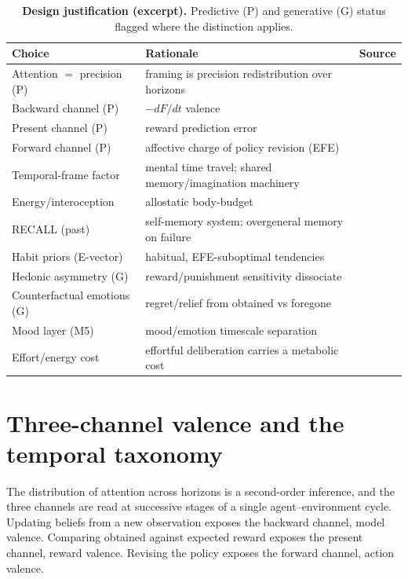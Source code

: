 \documentclass[11pt,a4paper]{article}
\begin{document}
\begin{table}[htbp]
\centering\small
\caption{\textbf{Design justification (excerpt).} Predictive (P) and generative (G)
status flagged where the distinction applies.}
\label{tab:justification}
\begin{tabular}{p{3.3cm}p{6.0cm}p{3.7cm}}
\toprule
Choice & Rationale & Source \\
\midrule
Attention $=$ precision (P) & framing is precision redistribution over horizons & \citet{feldman2010attention} \\
Backward channel (P) & $-dF/dt$ valence & \citet{joffily2013emotional} \\
Present channel (P) & reward prediction error & \citet{pattisapu2024free} \\
Forward channel (P) & affective charge of policy revision (EFE) & \citet{hesp2021deeply} \\
Temporal-frame factor & mental time travel; shared memory/imagination machinery & \citet{schacter-addis2007,suddendorf-corballis1997} \\
Energy/interoception & allostatic body-budget & \citet{seth2016interoceptive,stephan2016allostatic} \\
RECALL (past) & self-memory system; overgeneral memory on failure & \citet{williams2007autobiographical} \\
Habit priors (E-vector) & habitual, EFE-suboptimal tendencies & \citet{dacosta2020active,watkins2008constructive} \\
Hedonic asymmetry (G) & reward/punishment sensitivity dissociate & \citet{eshel2010reward,pizzagalli2014depression} \\
Counterfactual emotions (G) & regret/relief from obtained vs foregone & \citet{hesp2020sophisticated} \\
Mood layer (M5) & mood/emotion timescale separation & \citet{hesp2021deeply,eldar2016mood} \\
Effort/energy cost & effortful deliberation carries a metabolic cost & \citet{treadway2009effort} \\
\bottomrule
\end{tabular}
\end{table}

\section{Three-channel valence and the temporal taxonomy}\label{sec:taxonomy}
The distribution of attention across horizons is a second-order inference, and the
three channels are read at successive stages of a single agent--environment cycle.
Updating beliefs from a new observation exposes the backward channel, model valence.
Comparing obtained against expected reward exposes the present channel, reward
valence. Revising the policy exposes the forward channel, action valence.
\end{document}
